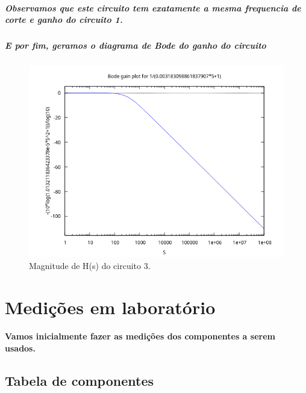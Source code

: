 \documentclass[12pt,twoside, a4paper, twocolumn]{article}
\begin{document}
\subparagraph*{Observamos que este circuito  tem exatamente a mesma frequencia de corte e ganho do circuito 1.}


\subparagraph*{E por fim, geramos o diagrama de Bode do ganho do circuito}

\begin{figure}[h]
    \centering
    \includegraphics[width=1\columnwidth]{images/bodegain1.png}
    \caption{Magnitude de H(s) do circuito 3.}
\end{figure}

\newpage


\section{Medições em laboratório}








\paragraph{Vamos inicialmente fazer as medições dos componentes a serem usados.}








\subsection{Tabela de componentes}
\end{document}
